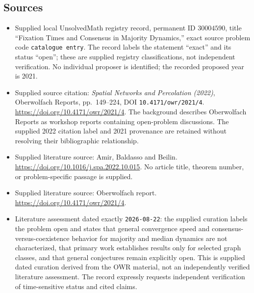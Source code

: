\documentclass[11pt]{article}
\begin{document}
\subsection{Sources}
\begin{itemize}
\item Supplied local UnsolvedMath registry record, permanent ID \(30004590\), title ``Fixation Times and Consensus in Majority Dynamics,'' exact source problem code \texttt{catalogue entry}. The record labels the statement ``exact'' and its status ``open''; these are supplied registry classifications, not independent verification. No individual proposer is identified; the recorded proposed year is 2021.
\item Supplied source citation: \emph{Spatial Networks and Percolation (2022)}, Oberwolfach Reports, pp.~149--224, DOI \texttt{10.4171/owr/2021/4}. \url{https://doi.org/10.4171/owr/2021/4}. The background describes Oberwolfach Reports as workshop reports containing open-problem discussions. The supplied 2022 citation label and 2021 provenance are retained without resolving their bibliographic relationship.
\item Supplied literature source: Amir, Baldasso and Beilin. \url{https://doi.org/10.1016/j.spa.2022.10.015}. No article title, theorem number, or problem-specific passage is supplied.
\item Supplied literature source: Oberwolfach report. \url{https://doi.org/10.4171/owr/2021/4}.
\item Literature assessment dated exactly \texttt{2026-08-22}: the supplied curation labels the problem open and states that general convergence speed and consensus-versus-coexistence behavior for majority and median dynamics are not characterized, that primary work establishes results only for selected graph classes, and that general conjectures remain explicitly open. This is supplied dated curation derived from the OWR material, not an independently verified literature assessment. The record expressly requests independent verification of time-sensitive status and cited claims.
\end{itemize}
\end{document}
